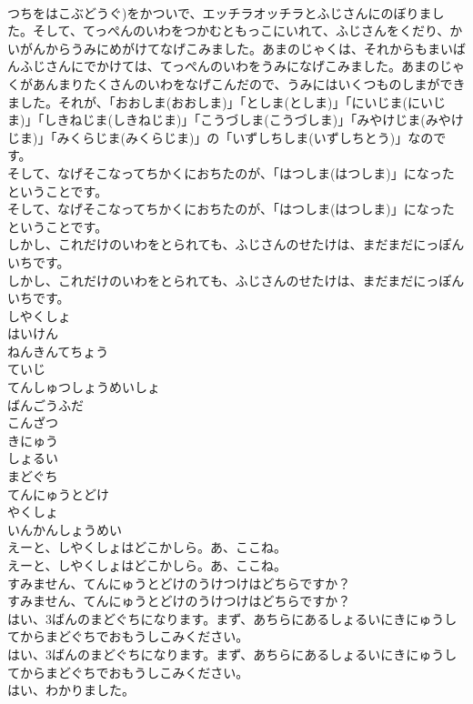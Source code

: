 \documentclass[8pt]{extreport}
\begin{document}
\begin{CJK}{UTF8}{min}
\\	つちをはこぶどうぐ)をかついで、エッチラオッチラとふじさんにのぼりました。そして、てっぺんのいわをつかむともっこにいれて、ふじさんをくだり、かいがんからうみにめがけてなげこみました。あまのじゃくは、それからもまいばんふじさんにでかけては、てっぺんのいわをうみになげこみました。あまのじゃくがあんまりたくさんのいわをなげこんだので、うみにはいくつものしまができました。それが、「おおしま(おおしま)」「としま(としま)」「にいじま(にいじま)」「しきねじま(しきねじま)」「こうづしま(こうづしま)」「みやけじま(みやけじま)」「みくらじま(みくらじま)」の「いずしちしま(いずしちとう)」なのです。
\\	そして、なげそこなってちかくにおちたのが、「はつしま(はつしま)」になったということです。
\\	そして、なげそこなってちかくにおちたのが、「はつしま(はつしま)」になったということです。
\\	しかし、これだけのいわをとられても、ふじさんのせたけは、まだまだにっぽんいちです。
\\	しかし、これだけのいわをとられても、ふじさんのせたけは、まだまだにっぽんいちです。
\\	しやくしょ
\\	はいけん
\\	ねんきんてちょう
\\	ていじ
\\	てんしゅつしょうめいしょ
\\	ばんごうふだ
\\	こんざつ
\\	きにゅう
\\	しょるい
\\	まどぐち
\\	てんにゅうとどけ
\\	やくしょ
\\	いんかんしょうめい
\\	えーと、しやくしょはどこかしら。あ、ここね。
\\	えーと、しやくしょはどこかしら。あ、ここね。
\\	すみません、てんにゅうとどけのうけつけはどちらですか？
\\	すみません、てんにゅうとどけのうけつけはどちらですか？
\\	はい、3ばんのまどぐちになります。まず、あちらにあるしょるいにきにゅうしてからまどぐちでおもうしこみください。
\\	はい、3ばんのまどぐちになります。まず、あちらにあるしょるいにきにゅうしてからまどぐちでおもうしこみください。
\\	はい、わかりました。

\end{CJK}
\end{document}
